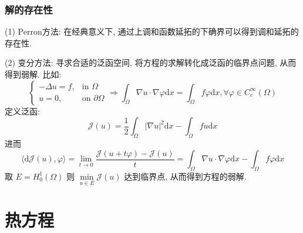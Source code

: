 \documentclass[11pt]{ctexart}[UTF8]
\begin{document}
\subsubsection{解的存在性}
(1) Perron方法: 在经典意义下, 通过上调和函数延拓的下确界可以得到调和延拓的存在性.\par
(2) 变分方法: 寻求合适的泛函空间, 将方程的求解转化成泛函的临界点问题, 从而得到弱解. 比如:
\begin{equation*}
    \begin{cases}
    -\Delta u = f, & \text{in } \Omega\\
    u = 0, & \text{on } \partial\Omega
    \end{cases} \Longrightarrow
    \int_{\Omega} \nabla u \cdot \nabla \varphi \mathrm{d}x = \int_{\Omega} f \varphi \mathrm{d}x, \forall \varphi \in C_{c}^{\infty}(\Omega)
\end{equation*}
定义泛函:
\begin{equation*}
    \mathcal{J}(u) = \frac{1}{2} \int_{\Omega} |\nabla u|^2 \mathrm{d}x - \int_{\Omega} f u \mathrm{d}x
\end{equation*}
进而
\begin{equation*}
    \langle \mathrm{d}\mathcal{J}(u), \varphi \rangle = \lim\limits_{t \to 0} \frac{\mathcal{J}(u + t\varphi) - \mathcal{J}(u)}{t} = \int_{\Omega} \nabla u \cdot \nabla \varphi \mathrm{d}x - \int_{\Omega} f \varphi \mathrm{d}x
\end{equation*}
取 $E = H_0^1(\Omega)$ 则 $\min\limits_{u \in E} \mathcal{J}(u)$ 达到临界点, 从而得到方程的弱解.\\
\newpage
\section{热方程}
\end{document}
